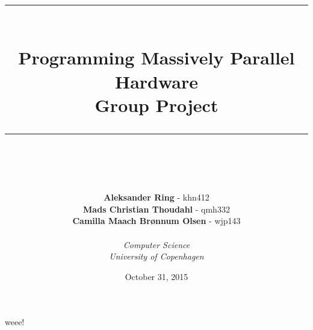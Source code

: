 \documentclass[11pt]{article}
\newcommand{\HRule}{\rule{\linewidth}{0.5mm}}
\begin{document}
\begin{titlepage}
\title{\HRule \\[0.4cm]
\textbf{Programming Massively Parallel Hardware}\\Group Project\\
\HRule \\[0.4cm]}
\author{\textbf{Aleksander Ring} - khn412\\
\textbf{Mads Christian Thoudahl} - qmh332\\
\textbf{Camilla Maach Brønnum Olsen} - wjp143\\\\
\textit{Computer Science}\\
\textit{University of Copenhagen}}
\date{October 31, 2015}
\maketitle
\thispagestyle{empty}
\end{titlepage}
weee!
\end{document}
